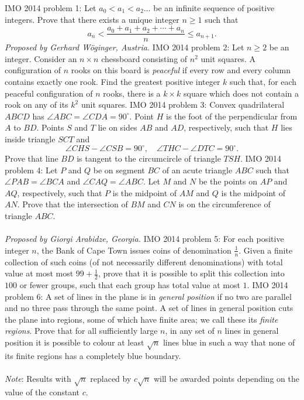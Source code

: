 IMO 2014 problem 1:  Let $a_0 < a_1 < a_2 \ldots$ be an infinite sequence of positive integers. Prove that there exists a unique integer $n\geq 1$ such that
\[ a_n < \frac{a_0+a_1+a_2+\cdots+a_n}{n} \leq a_{n+1}. \]
\textit{Proposed by Gerhard Wöginger, Austria.} 
IMO 2014 problem 2:  Let $n \ge 2$ be an integer. Consider an $n \times n$ chessboard consisting of $n^2$ unit squares. A configuration of $n$ rooks on this board is \textit{peaceful} if every row and every column contains exactly one rook. Find the greatest positive integer $k$ such that, for each peaceful configuration of $n$ rooks, there is a $k \times k$ square which does not contain a rook on any of its $k^2$ unit squares. 
IMO 2014 problem 3:  Convex quadrilateral $ABCD$ has $\angle ABC = \angle CDA = 90^{\circ}$. Point $H$ is the foot of the perpendicular from $A$ to $BD$. Points $S$ and $T$ lie on sides $AB$ and $AD$, respectively, such that $H$ lies inside triangle $SCT$ and
\[ \angle CHS - \angle CSB = 90^{\circ}, \quad \angle THC - \angle DTC = 90^{\circ}. \]
Prove that line $BD$ is tangent to the circumcircle of triangle $TSH$. 
IMO 2014 problem 4:  Let $P$ and $Q$ be on segment $BC$ of an acute triangle $ABC$ such that $\angle PAB=\angle BCA$ and $\angle CAQ=\angle ABC$. Let $M$ and $N$ be the points on $AP$ and $AQ$, respectively, such that $P$ is the midpoint of $AM$ and $Q$ is the midpoint of $AN$. Prove that the intersection of $BM$ and $CN$ is on the circumference of triangle $ABC$. \\\\
\textit{Proposed by Giorgi Arabidze, Georgia.} 
IMO 2014 problem 5:  For each positive integer $n$, the Bank of Cape Town issues coins of denomination $\frac1n$. Given a finite collection of such coins (of not necessarily different denominations) with total value at most most $99+\frac12$, prove that it is possible to split this collection into $100$ or fewer groups, such that each group has total value at most $1$. 
IMO 2014 problem 6:  A set of lines in the plane is in \textit{general position} if no two are parallel and no three pass through the same point. A set of lines in general position cuts the plane into regions, some of which have finite area; we call these its \textit{finite regions}. Prove that for all sufficiently large $n$, in any set of $n$ lines in general position it is possible to colour at least $\sqrt{n}$ lines blue in such a way that none of its finite regions has a completely blue boundary. \\\\
\textit{Note}: Results with $\sqrt{n}$ replaced by $c\sqrt{n}$ will be awarded points depending on the value of the constant $c$. 

